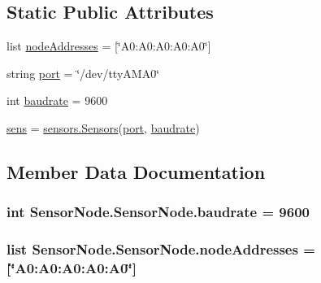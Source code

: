\subsection*{Static Public Attributes}
\begin{DoxyCompactItemize}
\item 
list \hyperlink{classSensorNode_1_1SensorNode_a17be4a277b9bfdd041ec006b462d497c}{node\+Addresses} = \mbox{[}\char`\"{}A0\+:\+A0\+:\+A0\+:\+A0\+:\+A0\char`\"{}\mbox{]}
\item 
string \hyperlink{classSensorNode_1_1SensorNode_a94712cd1b0bf09fa4cd3de94ca666575}{port} = \char`\"{}/dev/tty\+A\+M\+A0\char`\"{}
\item 
int \hyperlink{classSensorNode_1_1SensorNode_a68f7a87f1d03a2734f3f6505f801a92e}{baudrate} = 9600
\item 
\hyperlink{classSensorNode_1_1SensorNode_ad8aec254c15c97a8b5c709480f31b2bb}{sens} = \hyperlink{classsensors_1_1Sensors}{sensors.\+Sensors}(\hyperlink{classSensorNode_1_1SensorNode_a94712cd1b0bf09fa4cd3de94ca666575}{port}, \hyperlink{classSensorNode_1_1SensorNode_a68f7a87f1d03a2734f3f6505f801a92e}{baudrate})
\end{DoxyCompactItemize}


\subsection{Member Data Documentation}
\subsubsection[{\texorpdfstring{baudrate}{baudrate}}]{\setlength{\rightskip}{0pt plus 5cm}int Sensor\+Node.\+Sensor\+Node.\+baudrate = 9600\hspace{0.3cm}{\ttfamily [static]}}\hypertarget{classSensorNode_1_1SensorNode_a68f7a87f1d03a2734f3f6505f801a92e}{}\label{classSensorNode_1_1SensorNode_a68f7a87f1d03a2734f3f6505f801a92e}
\subsubsection[{\texorpdfstring{node\+Addresses}{nodeAddresses}}]{\setlength{\rightskip}{0pt plus 5cm}list Sensor\+Node.\+Sensor\+Node.\+node\+Addresses = \mbox{[}\char`\"{}A0\+:\+A0\+:\+A0\+:\+A0\+:\+A0\char`\"{}\mbox{]}\hspace{0.3cm}{\ttfamily [static]}}\hypertarget{classSensorNode_1_1SensorNode_a17be4a277b9bfdd041ec006b462d497c}{}\label{classSensorNode_1_1SensorNode_a17be4a277b9bfdd041ec006b462d497c}

